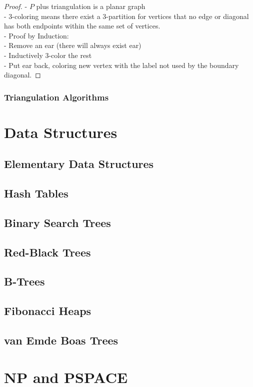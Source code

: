 				\begin{proof}
					- $P$ plus triangulation is a planar graph\\
					- 3-coloring means there exist a 3-partition for vertices that no edge or diagonal has both endpoints within the same set of vertices.\\
					- Proof by Induction:\\
					\indent - Remove an ear (there will always exist ear) \\
					\indent - Inductively 3-color the rest\\
					\indent - Put ear back, coloring new vertex with the label not used by the boundary diagonal.
				\end{proof}

			\subsection{Triangulation Algorithms}

	\chapter{Data Structures}
		\section{Elementary Data Structures}

		\section{Hash Tables}

		\section{Binary Search Trees}

		\section{Red-Black Trees}

		\section{B-Trees}

		\section{Fibonacci Heaps}

		\section{van Emde Boas Trees}

	\chapter{NP and PSPACE}